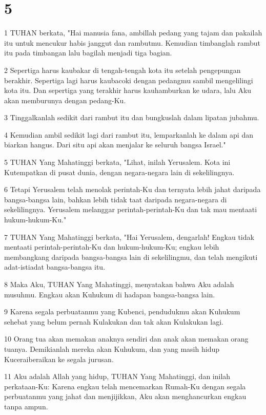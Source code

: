 \chapter{5}

\par 1 TUHAN berkata, "Hai manusia fana, ambillah pedang yang tajam dan pakailah itu untuk mencukur habis janggut dan rambutmu. Kemudian timbanglah rambut itu pada timbangan lalu bagilah menjadi tiga bagian.
\par 2 Sepertiga harus kaubakar di tengah-tengah kota itu setelah pengepungan berakhir. Sepertiga lagi harus kaubacoki dengan pedangmu sambil mengelilingi kota itu. Dan sepertiga yang terakhir harus kauhamburkan ke udara, lalu Aku akan memburunya dengan pedang-Ku.
\par 3 Tinggalkanlah sedikit dari rambut itu dan bungkuslah dalam lipatan jubahmu.
\par 4 Kemudian ambil sedikit lagi dari rambut itu, lemparkanlah ke dalam api dan biarkan hangus. Dari situ api akan menjalar ke seluruh bangsa Israel."
\par 5 TUHAN Yang Mahatinggi berkata, "Lihat, inilah Yerusalem. Kota ini Kutempatkan di pusat dunia, dengan negara-negara lain di sekelilingnya.
\par 6 Tetapi Yerusalem telah menolak perintah-Ku dan ternyata lebih jahat daripada bangsa-bangsa lain, bahkan lebih tidak taat daripada negara-negara di sekelilingnya. Yerusalem melanggar perintah-perintah-Ku dan tak mau mentaati hukum-hukum-Ku."
\par 7 TUHAN Yang Mahatinggi berkata, "Hai Yerusalem, dengarlah! Engkau tidak mentaati perintah-perintah-Ku dan hukum-hukum-Ku; engkau lebih membangkang daripada bangsa-bangsa lain di sekelilingmu, dan telah mengikuti adat-istiadat bangsa-bangsa itu.
\par 8 Maka Aku, TUHAN Yang Mahatinggi, menyatakan bahwa Aku adalah musuhmu. Engkau akan Kuhukum di hadapan bangsa-bangsa lain.
\par 9 Karena segala perbuatanmu yang Kubenci, pendudukmu akan Kuhukum sehebat yang belum pernah Kulakukan dan tak akan Kulakukan lagi.
\par 10 Orang tua akan memakan anaknya sendiri dan anak akan memakan orang tuanya. Demikianlah mereka akan Kuhukum, dan yang masih hidup Kuceraiberaikan ke segala jurusan.
\par 11 Aku adalah Allah yang hidup, TUHAN Yang Mahatinggi, dan inilah perkataan-Ku: Karena engkau telah mencemarkan Rumah-Ku dengan segala perbuatanmu yang jahat dan menjijikkan, Aku akan menghancurkan engkau tanpa ampun.
